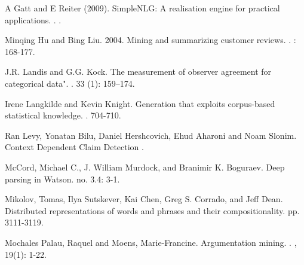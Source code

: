 \documentclass[11pt]{article}
\begin{document}
\begin{thebibliography}{}

A Gatt and E Reiter (2009). SimpleNLG: A realisation engine for practical applications.
.
.

Minqing Hu and Bing Liu. 2004. Mining and summarizing customer reviews.
.
: 168-177.

J.R. Landis and G.G. Kock. The measurement of observer agreement for categorical data". 
.
 33 (1): 159–174.

Irene Langkilde and Kevin Knight. Generation that exploits corpus-based statistical knowledge. 
. 
 704-710. 

Ran Levy, Yonatan Bilu, Daniel Hershcovich, Ehud Aharoni and Noam Slonim. Context Dependent Claim Detection
.

McCord, Michael C., J. William Murdock, and Branimir K. Boguraev. Deep parsing in Watson.
 no. 3.4: 3-1.

Mikolov, Tomas, Ilya Sutskever, Kai Chen, Greg S. Corrado, and Jeff Dean. Distributed representations of words and phrases and their compositionality.
 pp. 3111-3119. 

Mochales Palau, Raquel and Moens, Marie-Francine. Argumentation mining.
.
, 19(1): 1-22.


\end{thebibliography}
\end{document}

